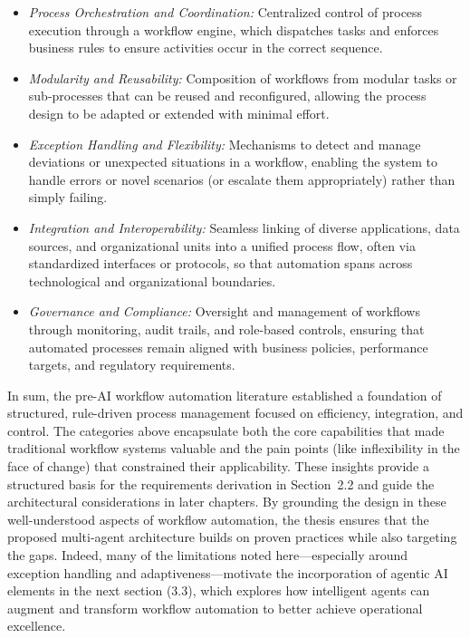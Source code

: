 \begin{itemize}
  \item \emph{Process Orchestration and Coordination:} Centralized control of process execution through a workflow engine, which dispatches tasks and enforces business rules to ensure activities occur in the correct sequence.
  \item \emph{Modularity and Reusability:} Composition of workflows from modular tasks or sub-processes that can be reused and reconfigured, allowing the process design to be adapted or extended with minimal effort.
  \item \emph{Exception Handling and Flexibility:} Mechanisms to detect and manage deviations or unexpected situations in a workflow, enabling the system to handle errors or novel scenarios (or escalate them appropriately) rather than simply failing.
  \item \emph{Integration and Interoperability:} Seamless linking of diverse applications, data sources, and organizational units into a unified process flow, often via standardized interfaces or protocols, so that automation spans across technological and organizational boundaries.
  \item \emph{Governance and Compliance:} Oversight and management of workflows through monitoring, audit trails, and role-based controls, ensuring that automated processes remain aligned with business policies, performance targets, and regulatory requirements.
\end{itemize}

In sum, the pre-AI workflow automation literature established a foundation of structured, rule-driven process management focused on efficiency, integration, and control. The categories above encapsulate both the core capabilities that made traditional workflow systems valuable and the pain points (like inflexibility in the face of change) that constrained their applicability. These insights provide a structured basis for the requirements derivation in Section~2.2 and guide the architectural considerations in later chapters. By grounding the design in these well-understood aspects of workflow automation, the thesis ensures that the proposed multi-agent architecture builds on proven practices while also targeting the gaps. Indeed, many of the limitations noted here---especially around exception handling and adaptiveness---motivate the incorporation of agentic AI elements in the next section (3.3), which explores how intelligent agents can augment and transform workflow automation to better achieve operational excellence.


